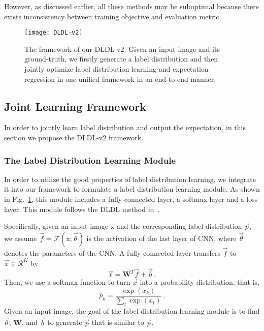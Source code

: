 \documentclass[5p,times,twocolumn]{elsarticle}
\begin{document}
However, as discussed earlier, all these methods may be suboptimal because there exists inconsistency between training objective and evaluation metric.

\begin{figure}
 \centering
 \texttt{[image: DLDL-v2]}
\caption{The framework of our DLDL-v2. Given an input image and its ground-truth, we firstly generate a label distribution and then jointly optimize label distribution learning and expectation regression in one unified framework in an end-to-end manner.} \label{fig:dldlv2f}
\vspace{-5pt}
\end{figure}

\subsection{Joint Learning Framework}
In order to jointly learn label distribution and output the expectation, in this section we propose the DLDL-v2 framework.

\subsubsection{The Label Distribution Learning Module}
In order to utilize the good properties of label distribution learning, we integrate it into our framework to formulate a label distribution learning module. As shown in Fig.~\ref{fig:dldlv2f}, this module includes a fully connected layer, a softmax layer and a loss layer. This module follows the DLDL method in~\cite{gao2017deep}.

Specifically, given an input image $\mathrm x$ and the corresponding label distribution $\vec p$, we assume $\vec f = \mathcal{F}(\mathrm x;\vec \theta)$ is the activation of the last layer of CNN, where $\vec \theta$ denotes the parameters of the CNN. A fully connected layer transfers 
$\vec f$ to $\vec x\in \mathcal {R}^K$ by
\begin{equation}\label{eq:linear}
\vec x = \mathbf{W}^{T}\vec f + \vec b\,.
\end{equation}
Then, we use a softmax function to turn $\vec x$ into a probability distribution, that is,
\begin{equation}\label{eq:sm}
\hat p_k = \frac{\exp (x_k)}{\sum_t {\exp (x_t)}}\,.
\end{equation}
Given an input image, the goal of the label distribution learning module is to find $\vec \theta$, $\mathbf W$, and $\vec b$ to generate $\hat {\vec p}$ that is similar to $\vec p$.
\end{document}

